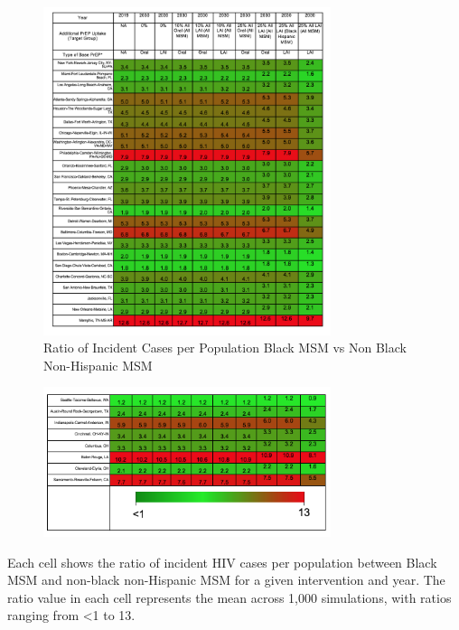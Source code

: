 \documentclass{article}
\begin{document}
\begin{figure}[H]
	\centering
	\caption{Ratio of Incident Cases per Population Black MSM vs Non Black Non-Hispanic MSM }
	\includegraphics[width=0.75\textwidth]{images/FigureS5_1}

\end{figure}

\pagebreak

\begin{figure}[H]
	\centering
	\includegraphics[width=0.75\textwidth]{images/FigureS5_2}
\end{figure}

Each cell shows the ratio of incident HIV cases per population between Black MSM and non-black non-Hispanic MSM for a given intervention and year. The ratio value in each cell represents the mean across 1,000 simulations, with ratios ranging from <1 to 13. 
\end{document}
